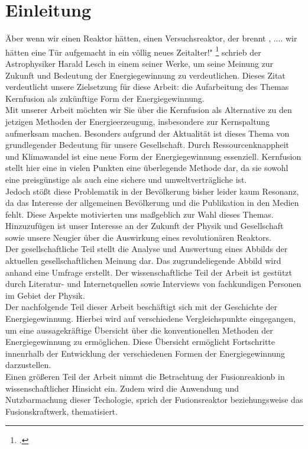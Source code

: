 \section{Einleitung}
\" Aber wenn wir einen Reaktor hätten, einen Versuchsreaktor, der brennt , .... wir hätten eine Tür aufgemacht in ein völlig neues Zeitalter!" \footcite{LeschH} schrieb der Astrophysiker Harald Lesch in einem seiner Werke, um seine Meinung zur Zukunft und Bedeutung der Energiegewinnung zu verdeutlichen. Dieses Zitat verdeutlicht unsere Zielsetzung für diese Arbeit: die Aufarbeitung des Themas Kernfusion als zukünftige Form der Energiegewinnung.\\
Mit unserer Arbeit möchten wir Sie über die Kernfusion als Alternative zu den jetzigen Methoden der Energieerzeugung, insbesondere zur Kernspaltung aufmerksam machen. Besonders aufgrund der Aktualität ist dieses Thema von grundlegender Bedeutung für unsere Gesellschaft. Durch Ressourcenknappheit und Klimawandel ist eine neue Form der Energiegewinnung essenziell. Kernfusion stellt hier eine in vielen Punkten eine überlegende Methode dar, da sie sowohl eine preisgünstige als auch eine sichere und umweltverträgliche ist. \\
Jedoch stößt diese Problematik in der Bevölkerung bisher leider kaum Resonanz, da das Interesse der allgemeinen Bevölkerung und die Publikation in den Medien fehlt. Diese Aspekte motivierten uns maßgeblich zur Wahl dieses Themas. Hinzuzufügen ist unser Interesse an der Zukunft der Physik und Gesellschaft sowie unsere Neugier über die Auswirkung eines revolutionären Reaktors.\\ 
Der gesellschaftliche Teil stellt die Analyse und Auswertung eines Abbilds der aktuellen gesellschaftlichen Meinung dar. Das zugrundeliegende Abbild wird anhand eine Umfrage erstellt. Der wissenschaftliche Teil der Arbeit ist gestützt durch Literatur- und Internetquellen sowie Interviews von fachkundigen Personen im Gebiet der Physik.\\
Der nachfolgende Teil dieser Arbeit beschäftigt sich mit der Geschichte der Energiegewinnung. Hierbei wird  auf verschiedene Vergleichspunkte eingegangen, um eine aussagekräftige Übersicht über die konventionellen Methoden der Energiegewinnung zu ermöglichen. Diese Übersicht ermöglicht Fortschritte innenrhalb der Entwicklung der verschiedenen Formen der Energiegewinnung darzustellen.\\
Einen größeren Teil der Arbeit nimmt die Betrachtung der Fusionreakionb in wissenschaftlicher Hinsicht ein. Zudem wird die Anwendung und Nutzbarmachung dieser Techologie, sprich der Fusionsreaktor beziehungsweise das Fusionskraftwerk, thematisiert.
